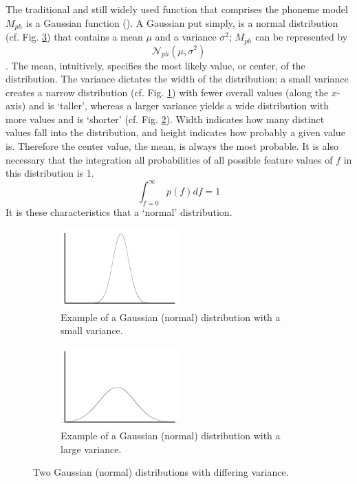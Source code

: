 The traditional and still widely used function that comprises the phoneme model $M_{ph}$ is a Gaussian function (\cite{gales:07}).  A Gaussian put simply, is a normal distribution (cf. Fig. \ref{fig:norm-dist}) that contains a mean $\mu$ and a variance $\sigma^2$; $M_{ph}$ can be represented by \begin{equation} \mathcal{N}_{ph}(\mu,\sigma^2) \end{equation}.  The mean, intuitively, specifies the most likely value, or center, of the distribution.  The variance dictates the width of the distribution; a small variance creates a narrow distribution (cf. Fig. \ref{fig:norm-narrow}) with fewer overall values (along the $x$-axis) and is `taller', whereas a larger variance yields a wide distribution with more values and is `shorter' (cf. Fig. \ref{fig:norm-wide}).  Width indicates how many distinct values fall into the distribution, and height indicates how probably a given value is.  Therefore the center value, the mean, is always the most probable.  It is also necessary that the integration all probabilities of all possible feature values of $f$ in this distribution is 1. \begin{equation} \int_{f=0}^\infty p(f) df = 1 \end{equation}  It is these characteristics that \DIFdelbegin {}\DIFdelend \DIFaddbegin {}\DIFaddend a `normal' distribution.  
%
\begin{figure}[H!]
\centering
\begin{subfigure}[c!]{0.5\textwidth}
\centering
\includegraphics[width=0.5\textwidth]{figure/norm-narrow.png}
\caption{Example of a Gaussian (normal) distribution with a small variance.}\label{fig:norm-narrow}
\end{subfigure}
\qquad
\begin{subfigure}[c!]{0.5\textwidth}
\centering
\includegraphics[width=0.5\textwidth]{figure/norm-wide.png}
\caption{Example of a Gaussian (normal) distribution with a large variance.}\label{fig:norm-wide}
\end{subfigure}
\caption{Two Gaussian (normal) distributions with differing variance.}\label{fig:norm-dist}
\end{figure}



